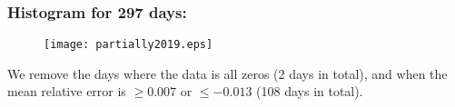 \documentclass[aspectratio=169]{beamer}\usepackage[utf8]{inputenc}
\begin{document}
\begin{frame}\frametitle{Histogram for 297 days:}
\begin{figure}[ht!]
\centering
{\texttt{[image: partially2019.eps]}}
\end{figure}
\alert{We remove the days where the data is all zeros (2 days in total), and when the mean relative error is $\geq0.007$ or $\leq-0.013$ (108 days in total).}
\end{frame}
\end{document}
